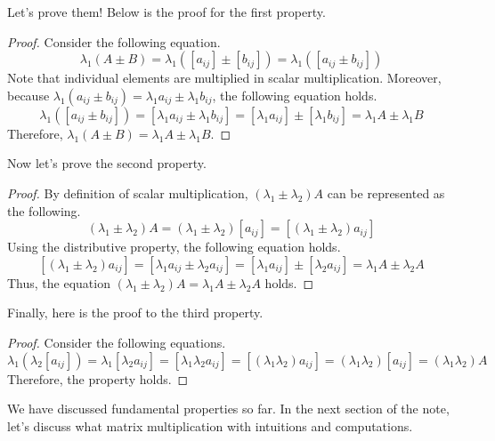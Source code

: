 \documentclass[../main.tex]{subfiles}
\begin{document}
Let's prove them! Below is the proof for the first property.

\begin{proof}
Consider the following equation.
\[
\lambda_1 (A \pm B)
= \lambda_1 ([a_{ij}] \pm [b_{ij}])
= \lambda_1 ([a_{ij} \pm b_{ij}])
\]
Note that individual elements are multiplied in scalar multiplication.
Moreover, because $\lambda_1 (a_{ij} \pm b_{ij}) = \lambda_1 a_{ij}
\pm \lambda_1 b_{ij}$, the following equation holds.
\[
\lambda_1 ([a_{ij} \pm b_{ij}])
= [\lambda_1 a_{ij} \pm \lambda_1 b_{ij}]
= [\lambda_1 a_{ij}] \pm [\lambda_1 b_{ij}]
= \lambda_1 A \pm \lambda_1 B
\]
Therefore, $\lambda_1 (A \pm B) = \lambda_1 A \pm \lambda_1 B$.
\end{proof}

Now let's prove the second property.

\begin{proof}
By definition of scalar multiplication, $(\lambda_1 \pm \lambda_2)
A$ can be represented as the following.
\[
(\lambda_1 \pm \lambda_2) A
= (\lambda_1 \pm \lambda_2) [a_{ij}]
= [(\lambda_1 \pm \lambda_2) a_{ij}]
\]
Using the distributive property, the following equation holds.
\[
[(\lambda_1 \pm \lambda_2) a_{ij}]
= [\lambda_1 a_{ij} \pm \lambda_2 a_{ij}]
= [\lambda_1 a_{ij}] \pm [\lambda_2 a_{ij}]
= \lambda_1 A \pm \lambda_2 A
\]
Thus, the equation $(\lambda_1 \pm \lambda_2) A =
\lambda_1 A \pm \lambda_2 A$ holds.
\end{proof}

Finally, here is the proof to the third property.

\begin{proof}
Consider the following equations.
\[
\lambda_1 (\lambda_2 [a_{ij}])
= \lambda_1 [\lambda_2 a_{ij}]
= [\lambda_1 \lambda_2 a_{ij}]
= [(\lambda_1 \lambda_2) a_{ij}]
= (\lambda_1 \lambda_2) [a_{ij}]
= (\lambda_1 \lambda_2) A
\]
Therefore, the property holds.
\end{proof}

We have discussed fundamental properties so far. In the next
section of the note, let's discuss what matrix multiplication
with intuitions and computations.
\end{document}
